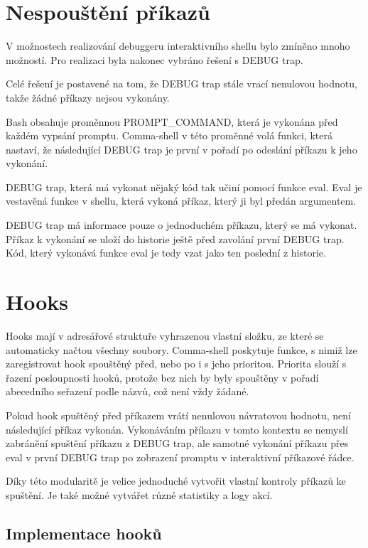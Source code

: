 \documentclass[thesis=M,czech]{FITthesis}[2012/06/26]
\begin{document}
%
%
%
%
%
\section{Nespouštění příkazů}\label{sec:debugtraprealization}
V možnostech realizování debuggeru interaktivního shellu bylo zmíněno mnoho možností. Pro realizaci byla nakonec vybráno řešení s DEBUG trap.

Celé řešení je postavené na tom, že DEBUG trap stále vrací nenulovou hodnotu, takže žádné příkazy nejsou vykonány.

Bash obsahuje proměnnou PROMPT\_COMMAND, která je vykonána před každém vypsání promptu. Comma-shell v této proměnné volá funkci, která nastaví, že následující DEBUG trap je první v pořadí po odeslání příkazu k jeho vykonání.

DEBUG trap, která má vykonat nějaký kód tak učiní pomocí funkce eval. Eval je vestavěná funkce v shellu, která vykoná příkaz, který ji byl předán argumentem.

DEBUG trap má informace pouze o jednoduchém příkazu, který se má vykonat. Příkaz k vykonání se uloží do historie ještě před zavolání první DEBUG trap. Kód, který vykonává funkce eval je tedy vzat jako ten poslední z historie.



%
%
%
%
%
\section{Hooks}

Hooks mají v adresářové struktuře vyhrazenou vlastní složku, ze které se automaticky načtou všechny soubory. Comma-shell poskytuje funkce, s nimiž lze zaregistrovat hook spouštěný před, nebo po i s jeho prioritou. Priorita slouží s řazení posloupnosti hooků, protože bez nich by byly spouštěny v pořadí abecedního seřazení podle názvů, což není vždy žádané.

Pokud hook spuštěný před příkazem vrátí nenulovou návratovou hodnotu, není následující příkaz vykonán. Vykonáváním příkazu v tomto kontextu se nemyslí zabránění spuštění příkazu z DEBUG trap, ale samotné vykonání příkazu přes eval v první DEBUG trap po zobrazení promptu v interaktivní příkazové řádce.

Díky této modularitě je velice jednoduché vytvořit vlastní kontroly příkazů ke spuštění. Je také možné vytvářet různé statistiky a logy akcí.


\subsection{Implementace hooků}
\end{document}
